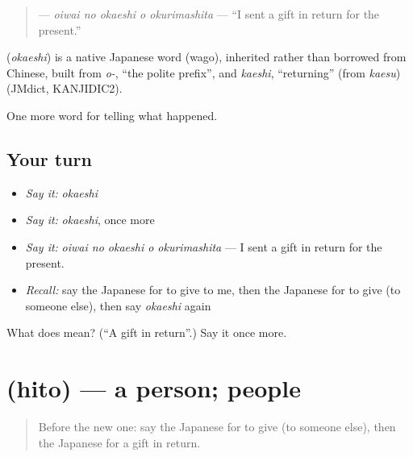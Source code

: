 \begin{quote}
\textbf{  } — \emph{oiwai no okaeshi o okurimashita} — \textquotedblleft{}I sent a gift in return for the present.\textquotedblright{}
\end{quote}

\begin{cousinweb}
\textbf{} (\emph{okaeshi}) is a native Japanese word (wago), inherited rather than borrowed from Chinese, built from \emph{o-}, \textquotedblleft{}the polite prefix\textquotedblright{}, and \emph{kaeshi}, \textquotedblleft{}returning\textquotedblright{} (from \emph{kaesu}) (JMdict, KANJIDIC2).
\end{cousinweb}

\begin{grammarlens}[title={What you've built}]
One more word for telling what happened.
\end{grammarlens}

\subsection*{Your turn}
\begin{itemize}
\raggedright
  \item \emph{Say it:} \emph{okaeshi}
  \item \emph{Say it:} \emph{okaeshi}, once more
  \item \emph{Say it:} \emph{oiwai no okaeshi o okurimashita} — I sent a gift in return for the present.
  \item \emph{Recall:} say the Japanese for to give to me, then the Japanese for to give (to someone else), then say \emph{okaeshi} again
\end{itemize}

\begin{tcolorbox}[breakable,colback=teal!4,colframe=teal!35!black,title={Before you move on}]
What does  mean? (\textquotedblleft{}A gift in return\textquotedblright{}.) Say it once more.
\end{tcolorbox}
\section[\texorpdfstring{\ja{ひと} (hito)}{ひと (hito)}]{ (hito) — a person; people}

\label{lesson:JA-C309-hito}



\begin{quote}
Before the new one: say the Japanese for to give (to someone else), then the Japanese for a gift in return.
\end{quote}

